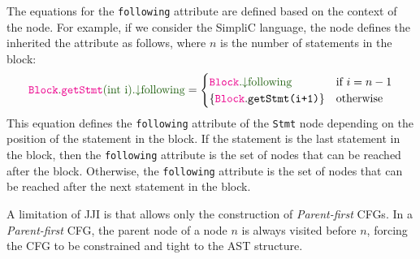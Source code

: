 The equations for the \texttt{following} attribute are defined based on the context 
of the node. For example, if we consider the SimpliC language, the  node
defines the inherited the attribute  as follows, where $n$ is the
number of statements in the block:
\begin{align}
    \Ainhindex{Block}{getStmt}{int i}{following} = \begin{cases}
        \Ainh{Block}{following} & \text{if } i=n-1\\
        \{\astnode{Block}.\code{getStmt(i+1)}\} & \text{otherwise}
    \end{cases}
\end{align}
This equation defines the \texttt{following} attribute of the \texttt{Stmt} node 
depending on the position of the statement in the block. If the statement
is the last statement in the block, then the \texttt{following} attribute is
the set of nodes that can be reached after the block. Otherwise, the \texttt{following}
attribute is the set of nodes that can be reached after the next statement in the block.





A limitation of JJI is that allows only the construction of \emph{Parent-first} CFGs.
In a \emph{Parent-first} CFG, the parent node of a node $n$ is always visited before $n$, 
forcing the CFG to be constrained and tight to the AST structure.




